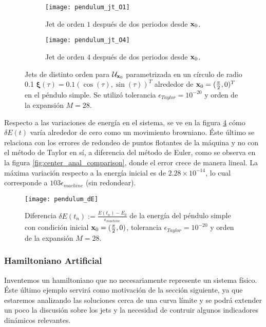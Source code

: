 \begin{figure}[h!]
\centering
\begin{subfigure}{0.49\textwidth}
	\centering
	\texttt{[image: pendulum\_jt\_O1]}
	\caption{Jet de orden $1$ después de dos periodos desde $\mathbf{x}_0$.}
	\label{fig:pendulum_jt_O1}
\end{subfigure}
%
\begin{subfigure}{0.49\textwidth}
	\centering
	\texttt{[image: pendulum\_jt\_O4]}
	\caption{Jet de orden $4$ después de dos periodos desde $\mathbf{x}_0$.}
	\label{fig:pendulum_jt_O4}
\end{subfigure}
\caption{Jets de distinto orden para $\mathcal{U}_{\mathbf{x}_0}$ parametrizada en un círculo de radio 0.1 $\mathbf{\xi}(\tau) = 0.1\left( \cos(\tau),\sin(\tau) \right)^T$ alrededor de $\mathbf{x}_0 = (\frac{\pi}{2},0)^T$ en el péndulo simple. Se utilizó tolerancia $\epsilon_{Taylor} = 10^{-20}$ y orden de la expansión $M = 28$.}
\label{fig:pendulum_jt}
\end{figure}

Respecto a las variaciones de energía en el sistema, se ve en la figura \ref{fig:pendulum_dE} cómo $\delta E(t)$ varía alrededor de cero como un movimiento browniano. Éste último se relaciona con los errores de redondeo de puntos flotantes de la máquina y no con el método de Taylor en sí, a diferencia del método de Euler, como se observa en la figura \ref{fig:center_anal_comparison}, donde el error crece de manera lineal. La máxima variación respecto a la energía inicial es de $2.28\times10^{-14}$, lo cual corresponde a $103 \epsilon_{machine}$ (sin redondear).

\begin{figure}[h!]
 \centering
 \texttt{[image: pendulum\_dE]}
 \caption{Diferencia $\delta E(t_n) := \frac{E(t_n) - E_0}{\epsilon_{machine}}$ de la energía del péndulo simple con condición inicial $\mathbf{x}_0 = (\frac{\pi}{2},0)$, tolerancia $\epsilon_{Taylor} = 10^{-20}$ y orden de la expansión $M = 28$.}
 \label{fig:pendulum_dE}
\end{figure}

\clearpage
\subsubsection{Hamiltoniano Artificial}
Inventemos un hamiltoniano que no necesariamente represente un sistema físico. Éste último ejemplo servirá como motivación de la sección siguiente, ya que estaremos analizando las soluciones cerca de una curva límite y se podrá extender un poco la discusión sobre los jets y la necesidad de contruir algunos indicadores dinámicos relevantes. 

